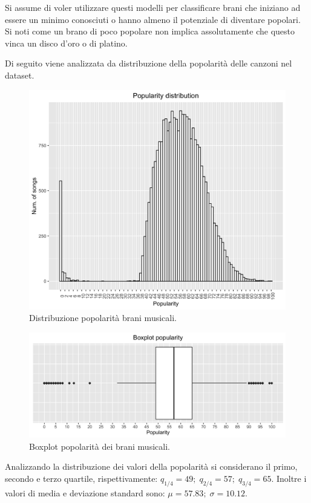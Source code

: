 Si assume di voler utilizzare questi modelli per classificare brani
che iniziano ad essere un minimo conosciuti o hanno almeno il
potenziale di diventare popolari. Si noti come un brano di poco
popolare non implica assolutamente che questo vinca un disco d'oro o
di platino.

Di seguito viene analizzata da distribuzione della popolarità delle
canzoni nel dataset.


\begin{figure}[H]
	\centering
	\includegraphics[width=13cm]{../images/popularity_distribution.png}
	\caption{Distribuzione popolarità brani musicali.}
\end{figure}

\begin{figure}[H]
\centering
\includegraphics[width=14cm]{../images/popularity_boxplot.png}
\caption{Boxplot popolarità dei brani musicali.}
\end{figure}

Analizzando la distribuzione dei valori della popolarità si
considerano il primo, secondo e terzo quartile, rispettivamente:
$q_{1/4} = 49; \; q_{2/4}= 57; \; q_{3/4} = 65$. Inoltre i valori di
media e deviazione standard sono: $\mu = 57.83; \; \sigma = 10.12$.

